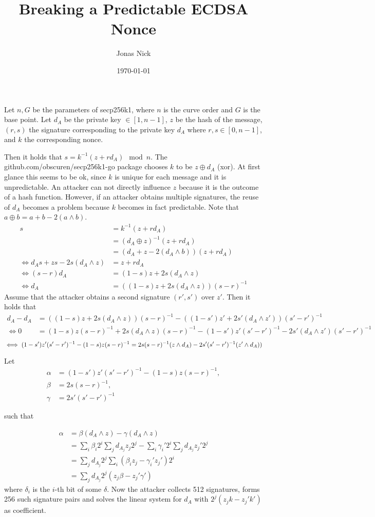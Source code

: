 \documentclass[11pt,a4paper,oneside]{article}
\title{Breaking a Predictable ECDSA Nonce}
\date{\today}
\author{Jonas Nick}
\begin{document}
\maketitle 
Let $n, G$ be the parameters of secp256k1, where $n$ is the curve order and $G$ is the base point.
Let $d_A$ be the private key $\in [1, n-1]$, $z$ be the hash of the message, $(r,s)$ the signature corresponding
to the private key $d_A$ where $r,s \in [0, n-1]$, and $k$ the corresponding nonce.

Then it holds that $s=k^{-1}(z+rd_A)\mod n$. The github.com/obscuren/secp256k1-go package chooses $k$ to be
$z\oplus d_A$ (xor). 
At first glance this seems to be ok, since $k$ is unique for each message and
it is unpredictable. An attacker can not directly influence $z$ because it is the outcome of a hash function.
However, if an attacker obtains multiple signatures, the reuse of $d_A$ becomes a problem because $k$ 
becomes in fact predictable. Note that $a \oplus b = a + b - 2(a\wedge b)$.
\begin{align*}
s&=k^{-1}(z+rd_A) \\
    &= (d_A\oplus z)^{-1}(z+rd_A)\\
    &= (d_A + z - 2(d_A\wedge b))(z+rd_A)\\
    \iff d_As + zs - 2s(d_A\wedge z)&= z + rd_A\\
    \iff (s-r)d_A &= (1-s)z + 2s(d_A\wedge z)\\
    \iff d_A &= ((1-s)z + 2s(d_A\wedge z))(s-r)^{-1}
\end{align*}
Assume that the attacker obtains a second signature $(r', s')$ over $z'$.
Then it holds that
\begin{align*}
    d_A - d_A &= ((1-s)z + 2s(d_A\wedge z))(s-r)^{-1} - ((1-s')z' + 2s'(d_A\wedge z'))(s'-r')^{-1} \\
\iff  0  &= (1-s)z(s-r)^{-1} + 2s(d_A\wedge z)(s-r)^{-1} - (1-s')z'(s'-r')^{-1} - 2s'(d_A\wedge z')(s'-r')^{-1} 
\end{align*}
$$
    \iff(1-s')z'(s'-r')^{-1} - (1-s)z(s-r)^{-1}=  2s(s-r)^{-1}(z \wedge d_A) - 2s'(s'-r')^{-1}(z' \wedge d_A) ) \\
$$


Let 
\begin{align*}
    \alpha &= (1-s')z'(s'-r')^{-1} - (1-s)z(s-r)^{-1}, \\
    \beta &= 2s(s-r)^{-1}, \\
    \gamma &= 2s'(s'-r')^{-1} 
\end{align*}

such that

\begin{align*}
    \alpha &= \beta (d_A \wedge z) - \gamma(d_A \wedge z) \\
           &= \sum_{i} \beta_i 2^i\sum_{j} d_{A_j} z_j 2^{j} - \sum_{i} \gamma_i' 2^i\sum_{j} d_{A_j} z_j' 2^{j} \\
    &= \sum_{j} d_{A_j} 2^j \sum_i (\beta_i z_j - \gamma_i' z_j') 2^i \\
    &= \sum_{j} d_{A_j} 2^j (z_j \beta - z_j' \gamma')
\end{align*}
where $\delta_i$ is the $i$-th bit of some $\delta$.
Now the attacker collects 512 signatures, forms 256 such signature pairs and solves the linear system for $d_A$ with $2^j (z_j k - z_j' k')$ as coefficient.
\end{document}
